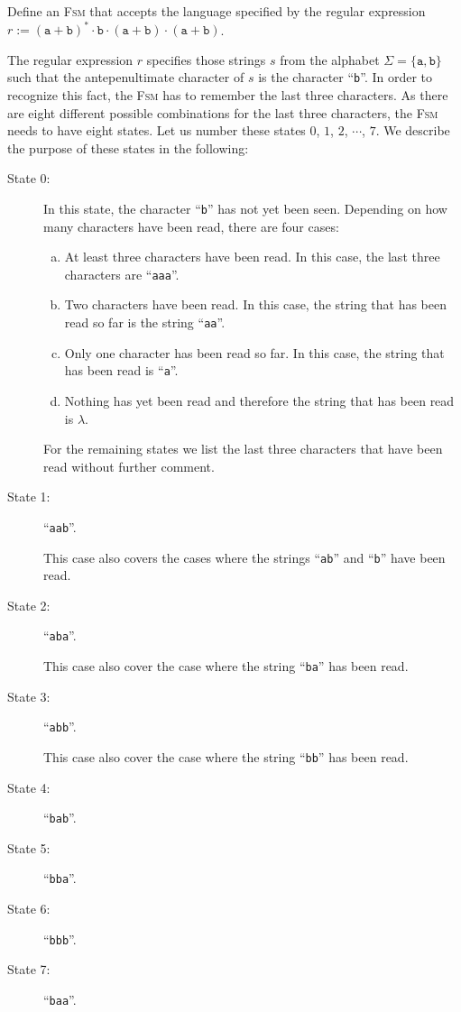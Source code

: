 \exerciseEng
Define an \textsc{Fsm} that accepts the language specified by the regular expression 
\\[0.2cm]
\hspace*{1.3cm}
$r := (\texttt{a}+\texttt{b})^* \cdot \texttt{b} \cdot (\texttt{a}+\texttt{b}) \cdot
(\texttt{a}+\texttt{b})$. \eox

\solutionEng
The regular expression $r$ specifies those strings $s$ from the alphabet 
$\Sigma = \{ \mathtt{a}, \mathtt{b} \}$ such that the antepenultimate character of $s$ is the
character ``\texttt{b}''.  In order to recognize this fact, the \textsc{Fsm} has to remember the
last three characters.  As there are eight different possible combinations for the last three
characters, the \textsc{Fsm} needs to have eight states.  Let us number these states 
 $0$, $1$, $2$, $\cdots$, $7$.  We describe the purpose of these states in the following:
\begin{description}
\item[State 0:] In this state, the character ``\texttt{b}'' has not yet been seen. 
  Depending on how many characters have been read, there are four cases:
  \begin{enumerate}[(a)]
  \item At least three characters have been read.  In this case, the last three characters are ``\texttt{aaa}''.  
  \item Two characters have been read.  In this case, the string that has been read so far is the string ``\texttt{aa}''.  
  \item Only one character has been read so far. In this case, the string that has been read is ``\texttt{a}''.  
  \item Nothing has yet been read and therefore the string that has been read is $\lambda$.
  \end{enumerate}

                For the remaining states we list the last three characters  that have been read
                without further comment.
\item[State 1:] ``\texttt{aab}''.

                This case also covers the cases where the strings ``\texttt{ab}'' and ``\texttt{b}''
                have been read.
\item[State 2:] ``\texttt{aba}''.

                This case also cover the case where the string ``\texttt{ba}'' 
                has been read.
\item[State 3:] ``\texttt{abb}''.

                This case also cover the case where the string ``\texttt{bb}'' 
                has been read.
\item[State 4:] ``\texttt{bab}''.
\item[State 5:] ``\texttt{bba}''.
\item[State 6:] ``\texttt{bbb}''.
\item[State 7:] ``\texttt{baa}''.
\end{description}

